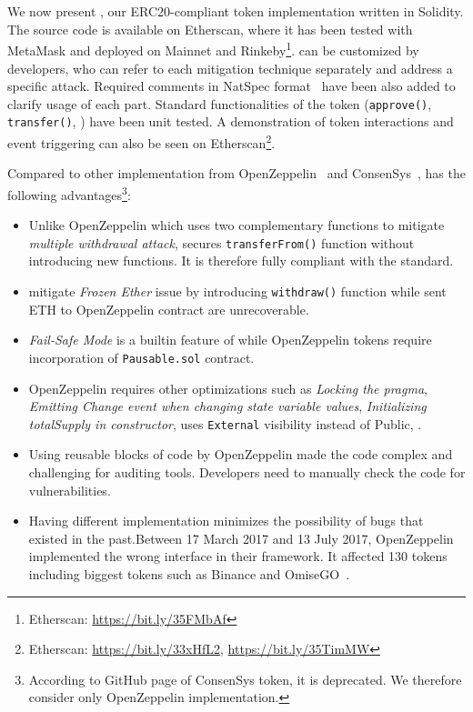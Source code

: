 
\section{\sys}\label{sec:proposal}

We now present \sys, our ERC20-compliant token implementation written in Solidity. The source code is available on Etherscan, where it has been tested with MetaMask and deployed on Mainnet and Rinkeby\footnote{Etherscan: \url{https://bit.ly/35FMbAf}}. \sys can be customized by developers, who can refer to each mitigation technique separately and address a specific attack. Required comments in NatSpec format~\cite{NatSpec} have been also added to clarify usage of each part. Standard functionalities of the token (\ie \texttt{approve()}, \texttt{transfer()}, \etc) have been unit tested. A demonstration of token interactions and event triggering can also be seen on Etherscan\footnote{Etherscan: \url{https://bit.ly/33xHfL2}, \url{https://bit.ly/35TimMW}}. {\blue Compared to other implementation from OpenZeppelin~\cite{OpenZepplin} and ConsenSys~\cite{ConsensysToken}, \sys has the following advantages\footnote{According to GitHub page of ConsenSys token, it is deprecated. We therefore consider only OpenZeppelin implementation.}:

\begin{itemize}
	\item Unlike OpenZeppelin which uses two complementary functions to mitigate \textit{multiple withdrawal attack}, \sys secures \texttt{transferFrom()} function without introducing new functions. It is therefore fully compliant with the \erc standard.
	\item \sys mitigate \textit{Frozen Ether} issue by introducing \texttt{withdraw()} function while sent ETH to OpenZeppelin contract are unrecoverable.
	\item \textit{Fail-Safe Mode} is a builtin feature of \sys while OpenZeppelin tokens require incorporation of \texttt{Pausable.sol} contract.
	\item OpenZeppelin requires other optimizations such as \textit{Locking the pragma}, \textit{Emitting Change event when changing state variable values}, \textit{Initializing totalSupply in constructor}, uses \texttt{External} visibility instead of Public, \etc.
	\item Using reusable blocks of code by OpenZeppelin made the code complex and challenging for auditing tools. Developers need to manually check the code for vulnerabilities.
	\item Having different \erc implementation minimizes the possibility of bugs that existed in the past.Between 17 March 2017 and 13 July 2017, OpenZeppelin implemented the wrong interface in their framework. It affected 130 tokens including biggest tokens such as Binance and OmiseGO~\cite{ErcBug}.
\end{itemize}
}

